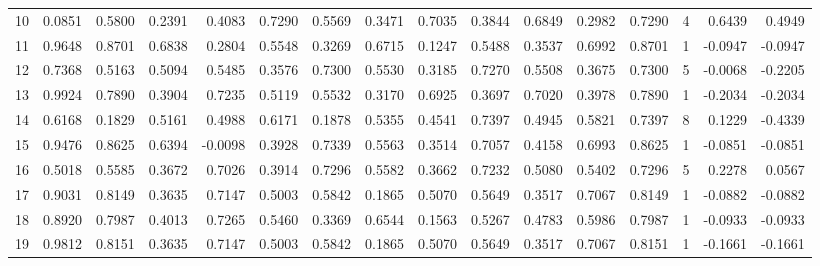 \begin{tabular}{lrrrrrrrrrrrrrrr}
10 &      0.0851 &  0.5800 &  0.2391 &  0.4083 &  0.7290 &  0.5569 &  0.3471 &  0.7035 &  0.3844 &  0.6849 &   0.2982 &     0.7290 &      4 &                    0.6439 &                     0.4949 \\
11 &      0.9648 &  0.8701 &  0.6838 &  0.2804 &  0.5548 &  0.3269 &  0.6715 &  0.1247 &  0.5488 &  0.3537 &   0.6992 &     0.8701 &      1 &                   -0.0947 &                    -0.0947 \\
12 &      0.7368 &  0.5163 &  0.5094 &  0.5485 &  0.3576 &  0.7300 &  0.5530 &  0.3185 &  0.7270 &  0.5508 &   0.3675 &     0.7300 &      5 &                   -0.0068 &                    -0.2205 \\
13 &      0.9924 &  0.7890 &  0.3904 &  0.7235 &  0.5119 &  0.5532 &  0.3170 &  0.6925 &  0.3697 &  0.7020 &   0.3978 &     0.7890 &      1 &                   -0.2034 &                    -0.2034 \\
14 &      0.6168 &  0.1829 &  0.5161 &  0.4988 &  0.6171 &  0.1878 &  0.5355 &  0.4541 &  0.7397 &  0.4945 &   0.5821 &     0.7397 &      8 &                    0.1229 &                    -0.4339 \\
15 &      0.9476 &  0.8625 &  0.6394 & -0.0098 &  0.3928 &  0.7339 &  0.5563 &  0.3514 &  0.7057 &  0.4158 &   0.6993 &     0.8625 &      1 &                   -0.0851 &                    -0.0851 \\
16 &      0.5018 &  0.5585 &  0.3672 &  0.7026 &  0.3914 &  0.7296 &  0.5582 &  0.3662 &  0.7232 &  0.5080 &   0.5402 &     0.7296 &      5 &                    0.2278 &                     0.0567 \\
17 &      0.9031 &  0.8149 &  0.3635 &  0.7147 &  0.5003 &  0.5842 &  0.1865 &  0.5070 &  0.5649 &  0.3517 &   0.7067 &     0.8149 &      1 &                   -0.0882 &                    -0.0882 \\
18 &      0.8920 &  0.7987 &  0.4013 &  0.7265 &  0.5460 &  0.3369 &  0.6544 &  0.1563 &  0.5267 &  0.4783 &   0.5986 &     0.7987 &      1 &                   -0.0933 &                    -0.0933 \\
19 &      0.9812 &  0.8151 &  0.3635 &  0.7147 &  0.5003 &  0.5842 &  0.1865 &  0.5070 &  0.5649 &  0.3517 &   0.7067 &     0.8151 &      1 &                   -0.1661 &                    -0.1661 \\
\bottomrule
\end{tabular}
